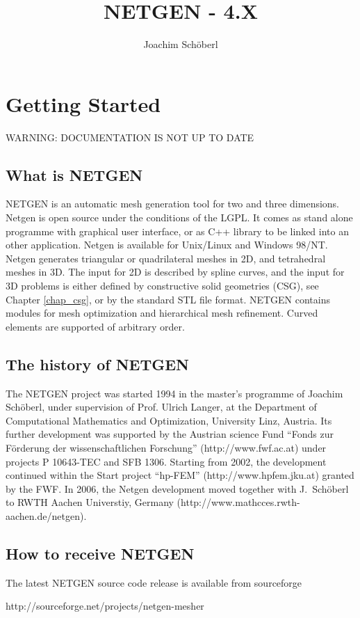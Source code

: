\documentclass[12pt]{book}
\title{NETGEN - 4.X}
\author{Joachim Sch\"oberl}
\begin{document}
\maketitle
\tableofcontents

\chapter{Getting Started}


WARNING: DOCUMENTATION IS NOT UP TO DATE


\section{What is NETGEN}
NETGEN is an automatic mesh generation tool for two and three
dimensions. Netgen is open source under the conditions of the LGPL.
It comes as stand alone programme with graphical user
interface, or as C++ library to be linked into an other application.
Netgen is available for Unix/Linux and Windows 98/NT.  Netgen
generates triangular or quadrilateral meshes in 2D, and tetrahedral
meshes in 3D. The input for 2D is described by spline curves, and the
input for 3D problems is either defined by constructive solid
geometries (CSG), see Chapter \ref{chap_csg}, or by the standard STL
file format.  NETGEN contains modules for mesh optimization and
hierarchical mesh refinement. Curved elements are supported of arbitrary
order.


\section{The history of NETGEN}
%
The NETGEN project was started 1994 in the master's programme of
Joachim Sch\"oberl, under supervision of Prof. Ulrich Langer, at the
Department of Computational Mathematics and Optimization, University
Linz, Austria.  Its further development was supported by the Austrian
science Fund ``Fonds zur F\"orderung der wissenschaftlichen
Forschung'' (http://www.fwf.ac.at) under projects P 10643-TEC and SFB
1306.  Starting from 2002, the development continued within the Start
project ``hp-FEM'' (http://www.hpfem.jku.at) granted by the FWF.  In
2006, the Netgen development moved together with J.~Sch\"oberl to RWTH
Aachen Universtiy, Germany (http://www.mathcces.rwth-aachen.de/netgen).


\section{How to receive NETGEN}
%
The latest NETGEN source code release is available from sourceforge
\begin{center}
http://sourceforge.net/projects/netgen-mesher
\end{center}
\end{document}
